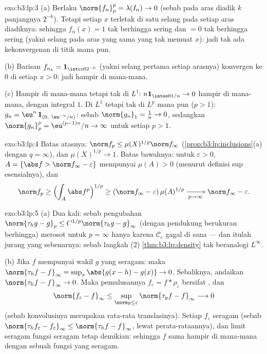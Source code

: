 \begin{solution}{exo:b3:lp:3}
(a) Berlaku $\norm{f_n}_p^p = \lambda(I_n) \to 0$ (sebab pada aras diadik $k$
panjangnya $2^{-k}$). Tetapi setiap $x$ terletak di satu selang pada
setiap aras diadiknya: sehingga $f_n(x) = 1$ tak berhingga sering dan $= 0$
tak berhingga sering (yakni selang pada aras yang sama yang tak memuat
$x$): jadi tak ada kekonvergenan di titik mana pun.

(b) Barisan $f_{n_k} = \mathbf 1_{\intcc0{2^{-k}}}$ (yakni selang pertama
setiap arasnya) konvergen ke $0$ di setiap $x > 0$: jadi hampir di mana-mana.

(c) Hampir di mana-mana tetapi tak di $L^1$: $n\mathbf 1_{\intoo0{1/n}} \to 0$
hampir di mana-mana, dengan integral $1$. Di $L^1$ tetapi tak di $L^p$ mana pun ($p > 1$): $g_n =
\eu^n\,\mathbf 1_{(0,\ \eu^{-n}/n)}$: sebab $\norm{g_n}_1 = \frac1n
\to 0$, sedangkan $\norm{g_n}_p^p = \eu^{(p-1)n}/n \to \infty$ untuk
setiap $p > 1$.
\end{solution}

\begin{solution}{exo:b3:lp:4}
Batas atasnya: $\norm f_p \leq \mu(X)^{1/p}\norm f_\infty$
(\cref{prop:b3:lp:inclusions}(a) dengan $q = \infty$), dan
$\mu(X)^{1/p} \to 1$. Batas bawahnya: untuk $\varepsilon > 0$, $A =
\{\abs f > \norm f_\infty - \varepsilon\}$ mempunyai $\mu(A) > 0$
(menurut definisi sup esensialnya), dan
\[
\norm f_p \geq \Bigl(\int_A \abs f^p\Bigr)^{1/p}
\geq (\norm f_\infty - \varepsilon)\,\mu(A)^{1/p}
\xrightarrow[p\to\infty]{} \norm f_\infty - \varepsilon .
\]
\end{solution}

\begin{solution}{exo:b3:lp:5}
(a) Dua kali: sebab pengubahan $\norm{\tau_hg - g}_p \leq
C^{1/p}\norm{\tau_hg - g}_\infty$ (dengan pendukung berukuran berhingga)
merosot untuk $p = \infty$ hanya karena \emph{
$\mathcal C_c$} gagal di sana --- dan itulah jurang yang sebenarnya: sebab langkah (2)
\cref{thm:b3:lp:density} tak beranalogi $L^\infty$.

(b) Jika $f$ mempunyai wakil $g$ yang  seragam:
maka $\norm{\tau_hf - f}_\infty = \sup_x\abs{g(x - h) - g(x)} \to
0$. Sebaliknya, andaikan $\norm{\tau_hf - f}_\infty \to 0$. Maka
pemulusannya $f_\varepsilon = f * \rho_\varepsilon$ bersifat
, dan
\[
\norm{f_\varepsilon - f}_\infty
\leq \sup_{\norm y \leq \varepsilon}\norm{\tau_yf -
f}_\infty \longrightarrow 0
\]
(sebab konvolusinya merupakan rata-rata translasinya). Setiap
$f_\varepsilon$  seragam
(sebab $\norm{\tau_hf_\varepsilon - f_\varepsilon}_\infty \leq
\norm{\tau_hf - f}_\infty$, lewat perata-rataannya), dan limit seragam
fungsi  seragam tetap demikian: sehingga $f$ sama hampir di mana-mana
dengan sebuah fungsi yang  seragam.
\end{solution}

